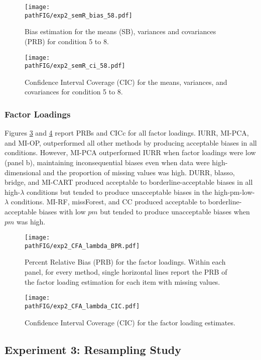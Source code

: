 \documentclass[]{./cls/interact}
\theoremstyle{plain}
\theoremstyle{definition}
\theoremstyle{remark}
\newcommand{\pathFIG}{./figures}
\begin{document}
\begin{figure}
	\centering
	\texttt{[image: \\pathFIG/exp2\_semR\_bias\_58.pdf]}
	\caption{Bias estimation for the means (SB), variances and covariances (PRB) for condition 5 
			to 8.}
	\label{fig:exp2bias58}
\end{figure}

\begin{figure}
	\centering
	\texttt{[image: \\pathFIG/exp2\_semR\_ci\_58.pdf]}
	\caption{Confidence Interval Coverage (CIC) for the means, variances, and covariances 
			for condition 5 to 8.}
	\label{fig:exp2cir58}
\end{figure}

\FloatBarrier

\subsubsection{Factor Loadings}
	Figures \ref{fig:exp2flAll_bias} and \ref{fig:exp2flAll_cic} report PRBs and CICc for all factor loadings.
	IURR, MI-PCA, and MI-OP, outperformed all other methods by producing acceptable biases in all conditions.
	However, MI-PCA outperformed IURR when factor loadings were low (panel b), maintaining inconsequential biases even when data were high-dimensional and the proportion of missing values was high. DURR, blasso, bridge, and MI-CART produced acceptable to borderline-acceptable biases in all high-$\lambda$ conditions but tended to produce unacceptable biases in the high-pm-low-$\lambda$ conditions. MI-RF, missForest, and CC produced acceptable to borderline-acceptable biases with low $pm$ but tended to produce unacceptable biases when $pm$ was high.

\begin{figure}
	\texttt{[image: \\pathFIG/exp2\_CFA\_lambda\_BPR.pdf]}
	\caption{
		Percent Relative Bias (PRB) for the factor loadings.
		Within each panel, for every method, single horizontal lines report the PRB of the 
		factor loading estimation for each item with missing values.
		}
\label{fig:exp2flAll_bias}
\end{figure}

\begin{figure}
	\texttt{[image: \\pathFIG/exp2\_CFA\_lambda\_CIC.pdf]}
	\caption{
		Confidence Interval Coverage (CIC) for the factor loading estimates.
		}
\label{fig:exp2flAll_cic}
\end{figure}

\FloatBarrier

\subsection{Experiment 3: Resampling Study}
\end{document}
